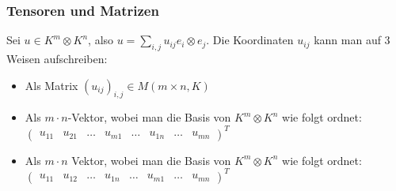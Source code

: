 \documentclass[8pt, a4paper, twocolumn, landscape]{article}
\newcommand{\comment}[1]{}
\begin{document}
\subsubsection{Tensoren und Matrizen}
\begin{remark}
Sei $u \in K^m \otimes K^n$, also $u = \sum\limits_{i, j} u_{ij} e_i \otimes e_j$.
Die Koordinaten $u_{ij}$ kann man auf 3 Weisen aufschreiben:
\begin{itemize}
\item Als Matrix $(u_{ij})_{i,j} \in M(m \times n, K)$
\item Als $m \cdot n$-Vektor, wobei man die Basis von $K^m \otimes K^n$ wie folgt ordnet:
$\left(\begin{array}{cccccccc}
u_{11} &
u_{21} &
\hdots &
u_{m1} &
\hdots &
u_{1n} &
\hdots &
u_{mn}
\end{array}\right)^T
$
\item Als $m \cdot  n$ Vektor, wobei man die Basis von $K^m \otimes K^n$ wie folgt ordnet: 
$\left(\begin{array}{cccccccc}
u_{11} &
u_{12} &
\hdots &
u_{1n} &
\hdots &
u_{m1} &
\hdots &
u_{mn}
\end{array}\right)^T
$
\comment{
\item Als $m \cdot n$-Vektor, wobei man die Basis von $K^m \otimes K^n$ wie folgt ordnet:
$\left(\begin{array}{c}
u_{11} \\
u_{21} \\
\vdots \\
u_{m1} \\
\vdots \\
u_{1n} \\
\vdots \\
u_{mn}
\end{array}\right)
$
\item Als $m \cdot  n$ Vektor, wobei man die Basis von $K^m \otimes K^n$ wie folgt ordnet: 
$\left(\begin{array}{c}
u_{11} \\
u_{12} \\
\vdots \\
u_{1n} \\
\vdots \\
u_{m1} \\
\vdots \\
u_{mn}
\end{array}\right)
$}
\end{itemize}

\end{remark}
\end{document}
